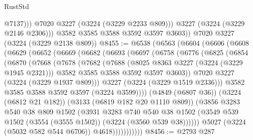 \begin{lexlean}{RustStd}
\begin{coremodule}
                  @7137)))
            @7020
            @3227
            (@3224 (@3229 @2233 @809)))
          @3227
          (@3224 (@3229 @2146 @2306)))
        @3582
        @3585
        @3588
        @3592
        @3597
        @3603))
    @7020
    @3227
    (@3224 (@3229 @2138 @809))
@8455 := @6538
    (@6563
      (@6604
        (@6606
          (@6608
            (@6629
              (@6652
                (@6669
                  (@6682
                    (@6693
                      (@6697
                        (@6758
                          (@6776
                            (@6825
                              (@6854
                                (@6870
                                  (@7668
                                    (@7678
                                      (@7682
                                        (@7688
                                          (@8025 @8363 @3227 (@3224 (@3229 @1945 @2321)))
                                          @3582
                                          @3585
                                          @3588
                                          @3592
                                          @3597
                                          @3603))
                                      @7020
                                      @3227
                                      (@3224 (@3229 @1937 @809)))
                                    @3227
                                    (@3224 (@3229 @1519 @2336)))
                                  @3582
                                  @3585
                                  @3588
                                  @3592
                                  @3597
                                  (@3224 @3599))))
                            (@4849 (@6807 @36))
                            (@3224 (@6812 @21 @182))
                            (@3133 (@6819 @182 @20 @1110 @809))
                            (@3856
                              @3283
                              @540
                              @38
                              @809
                              @1502
                              (@3931
                                @3283
                                @740
                                @540
                                @38
                                @1502
                                (@3549 @539 @1502 (@3554 (@3555 @1502)) (@3224 (@3560 @539 @38))))))
                          @5027
                          (@3224 (@5032 @582 @544 @6706))
                          @4618)))))))))))
@8456 := @2793 @287

\end{coremodule}
\end{lexlean}
